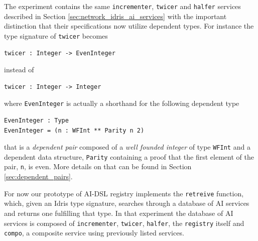 \documentclass[]{report}
\begin{document}
The experiment contains the same \texttt{incrementer}, \texttt{twicer}
and \texttt{halfer} services described in Section
\ref{sec:network_idris_ai_services} with the important distinction that
their specifications now utilize dependent types.  For instance the
type signature of \texttt{twicer} becomes
\begin{verbatim}
twicer : Integer -> EvenInteger
\end{verbatim}
instead of
\begin{verbatim}
twicer : Integer -> Integer
\end{verbatim}
where \texttt{EvenInteger} is actually a shorthand for the following
dependent type
\begin{verbatim}
EvenInteger : Type
EvenInteger = (n : WFInt ** Parity n 2)
\end{verbatim}
that is a \emph{dependent pair} composed of a \emph{well founded
integer} of type \texttt{WFInt} and a dependent data structure,
\texttt{Parity} containing a proof that the first element of the pair,
\texttt{n}, is even.  More details on that can be found in
Section \ref{sec:dependent_pairs}.

For now our prototype of AI-DSL registry implements the
\texttt{retreive} function, which, given an Idris type signature,
searches through a database of AI services and returns one fulfilling
that type.  In that experiment the database of AI services is composed
of \texttt{incrementer}, \texttt{twicer}, \texttt{halfer}, the
\texttt{registry} itself and \texttt{compo}, a composite service using
previously listed services.
\end{document}
